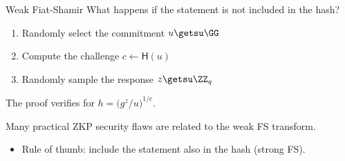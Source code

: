\begin{frame}{Weak Fiat-Shamir}
  What happens if the statement is not included in the hash?

  \begin{enumerate}[<+(1)->]
    \item Randomly select the commitment $u \getsu \GG$
    \item Compute the challenge $c \gets \mathsf{H}(u)$
    \item Randomly sample the response $z \getsu \ZZ_q$
  \end{enumerate}

  \pause
  The proof verifies for $h = \bigl(g^z/u\bigr)^{1/c}$.

  \vspace*{1em}

  \pause
  Many practical ZKP security flaws are related to the weak FS transform.
  \begin{itemize}
    \item Rule of thumb: include the statement also in the hash (strong FS).
  \end{itemize}
\end{frame}


